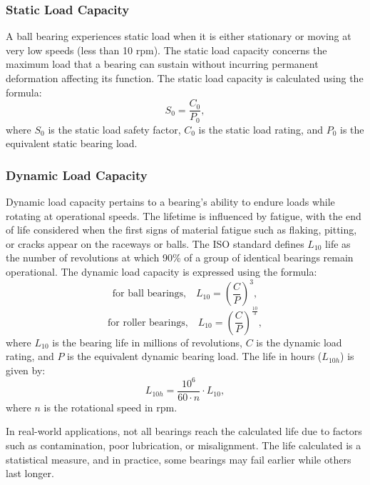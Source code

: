 \subsubsection{Static Load Capacity}
A ball bearing experiences static load when it is either stationary or moving at very low speeds (less than 10 \ac{rpm}). The static load capacity concerns the maximum load that a bearing can sustain without incurring permanent deformation affecting its function. The static load capacity is calculated using the formula:
\begin{equation}
S_{0} = \frac{C_{0}}{P_{0}},
\end{equation}
where \(S_{0}\) is the static load safety factor, \(C_{0}\) is the static load rating, and \(P_{0}\) is the equivalent static bearing load.

\subsubsection{Dynamic Load Capacity}
Dynamic load capacity pertains to a bearing's ability to endure loads while rotating at operational speeds. The lifetime is influenced by fatigue, with the end of life considered when the first signs of material fatigue such as flaking, pitting, or cracks appear on the raceways or balls. The ISO standard defines \(L_{10}\) life as the number of revolutions at which 90\% of a group of identical bearings remain operational. The dynamic load capacity is expressed using the formula:
\begin{equation}
\text{for ball bearings,} \quad L_{10} = \left(\frac{C}{P}\right)^3,
\end{equation}
\begin{equation}
\text{for roller bearings,} \quad L_{10} = \left(\frac{C}{P}\right)^\frac{10}{3},
\end{equation}
where \(L_{10}\) is the bearing life in millions of revolutions, \(C\) is the dynamic load rating, and \(P\) is the equivalent dynamic bearing load. The life in hours (\(L_{10h}\)) is given by:
\begin{equation}
L_{10h} = \frac{10^6}{60 \cdot n} \cdot L_{10},
\end{equation}
where \(n\) is the rotational speed in \ac{rpm}.

In real-world applications, not all bearings reach the calculated life due to factors such as contamination, poor lubrication, or misalignment. The life calculated is a statistical measure, and in practice, some bearings may fail earlier while others last longer.
